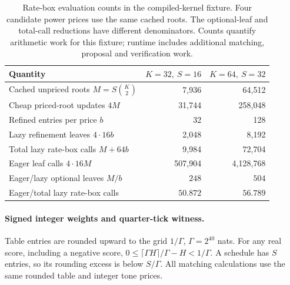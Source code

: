 \documentclass[10pt,letterpaper]{article}
\begin{document}
\begin{table}[htbp]
\centering
\small
\caption{Rate-box evaluation counts in the compiled-kernel fixture. Four candidate power prices use the same cached roots. The optional-leaf and total-call reductions have different denominators. Counts quantify arithmetic work for this fixture; runtime includes additional matching, proposal and verification work.}
\label{supp:table2}
\begin{tabular}{lrr}
\hline
Quantity & \(K=32,\ S=16\) & \(K=64,\ S=32\)\\
\hline
Cached unpriced roots \(M=S\binom K2\) & 7,936 & 64,512\\
Cheap priced-root updates \(4M\) & 31,744 & 258,048\\
Refined entries per price \(b\) & 32 & 128\\
Lazy refinement leaves \(4\cdot16b\) & 2,048 & 8,192\\
Total lazy rate-box calls \(M+64b\) & 9,984 & 72,704\\
Eager leaf calls \(4\cdot16M\) & 507,904 & 4,128,768\\
Eager/lazy optional leaves \(M/b\) & \(248\) & \(504\)\\
Eager/total lazy rate-box calls & \(50.872\) & \(56.789\)\\
\hline
\end{tabular}
\end{table}

\paragraph{Signed integer weights and quarter-tick witness.}
Table entries are rounded upward to the grid \(1/\Gamma\), \(\Gamma=2^{40}\) nats. For any real score, including a negative score,
\(0\leq\lceil\Gamma H\rceil/\Gamma-H<1/\Gamma\). A schedule has \(S\) entries, so its rounding excess is below \(S/\Gamma\). All matching calculations use the same rounded table and integer tone prices.
\end{document}
